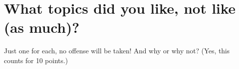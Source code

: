 \documentclass[12pt,reqno]{amsart}
\theoremstyle{definition}
\theoremstyle{remark}
\numberwithin{equation}{section}
\begin{document}
\newpage




\section{What topics did you like, not like (as much)?}
Just one for each, no offense will be taken! And why or why not? (Yes, this counts for 10 points.)
\end{document}

